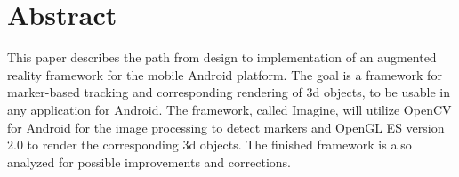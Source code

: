 \section*{Abstract}

This paper describes the path from design to implementation of an augmented reality framework for the mobile Android platform.
The goal is a framework for marker-based tracking and corresponding rendering of 3d objects, to be usable in any application for Android.
The framework, called Imagine, will utilize OpenCV for Android for the image processing to detect markers and OpenGL ES version 2.0 to render the corresponding 3d objects.
The finished framework is also analyzed for possible improvements and corrections.
